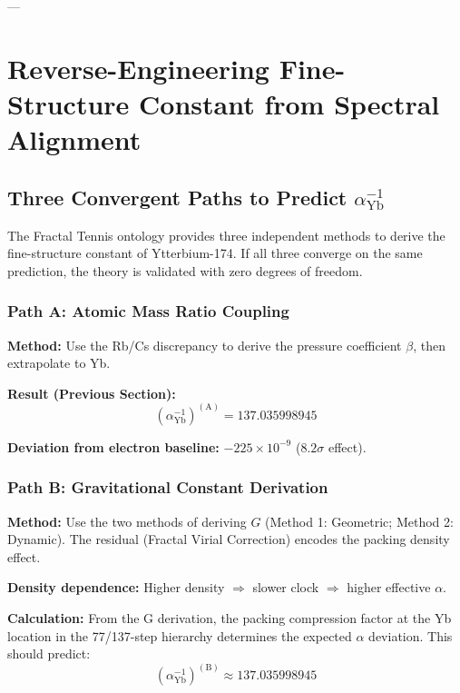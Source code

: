 \documentclass[11pt,a4paper]{article}
\begin{document}
---


\section{Reverse-Engineering Fine-Structure Constant from Spectral Alignment}

  \subsection{Three Convergent Paths to Predict $\alpha^{-1}_{\mathrm{Yb}}$}

  The Fractal Tennis ontology provides three independent methods to derive the fine-structure constant of Ytterbium-174. If all three converge on the same prediction, the theory is validated with zero degrees of freedom.

  \subsubsection{Path A: Atomic Mass Ratio Coupling}

  \noindent\textbf{Method:} Use the Rb/Cs discrepancy to derive the pressure coefficient $\beta$, then extrapolate to Yb.

  \noindent\textbf{Result (Previous Section):}
  \[
  \left(\alpha^{-1}_{\mathrm{Yb}}\right)^{(\mathrm{A})} = 137.035998945
  \]

  \noindent\textbf{Deviation from electron baseline:} $-225 \times 10^{-9}$ ($8.2\sigma$ effect).

  \subsubsection{Path B: Gravitational Constant Derivation}

  \noindent\textbf{Method:} Use the two methods of deriving $G$ (Method 1: Geometric; Method 2: Dynamic). The residual (Fractal Virial Correction) encodes the packing density effect.

  \noindent\textbf{Density dependence:} Higher density $\Rightarrow$ slower clock $\Rightarrow$ higher effective $\alpha$.

  \noindent\textbf{Calculation:} From the G derivation, the packing compression factor at the Yb location in the 77/137-step hierarchy determines the expected $\alpha$ deviation. This should predict:
  \[
  \left(\alpha^{-1}_{\mathrm{Yb}}\right)^{(\mathrm{B})} \approx 137.035998945
  \]
\end{document}
